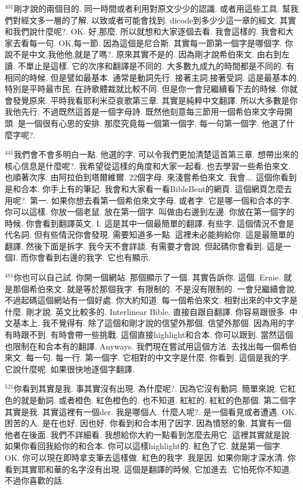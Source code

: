 \documentclass{book}
\begin{document}
$^{401}$剛才說的兩個目的.
同一時間或者利用對原文少少的認識.
或者用這些工具.
幫我們對經文多一層的了解.
以致或者可能會找到.
dicode到多少少這一章的經文.
其實和我們說什麼呢?.
OK.
好,那麼.
所以就想和大家逐個去看.
我會這樣的.
我會和大家去看每一句.
OK,每一節.
因為這個是尼合斯.
其實每一節第一個字是哪個字.
你說不是中文,我他他,就是了嗎?.
原來其實不是的.
因為剛才說希伯來文.
由右到左讀.
不單止是這樣.
它的次序和翻譯是不同的.
大多數九成九的時間都是不同的.
有相同的時候.
但是譬如最基本.
通常是動詞先行.
接著主詞,接著受詞.
這是最基本的.
特別是平時最市民.
在詩歌體裁就比較不同.
但是你一會兒繼續看下去的時候.
你就會發覺原來.
平時我看耶利米亞哀歌第三章.
其實是純粹中文翻譯.
所以大多數是你我他先行.
不過既然這首是一個字母詩.
既然他刻意每三節用一個希伯來文字母開頭.
是一個很有心思的安排.
那麼究竟每一個第一個字.
每一句第一個字.
他選了什麼字呢?.

$^{441}$我們會不會多明白一點.
他選的字.
可以令我們更加清楚這首第三章.
想帶出來的核心信息是什麼呢?.
我希望從這樣的角度和大家一起看.
也去學習一些希伯來文.
也順著次序.
由阿拉伯到塔爾維爾.
22個字母.
來淺嘗希伯來文.
我會….
這個你看到是和合本.
你手上有的筆記.
我會和大家看一看BibleBent的網頁.
這個網頁怎麼去用呢?.
第一.
如果你想去看第一個希伯來文字母.
或者字.
它是哪一個和合本的字.
你可以這樣.
你放一個老鼠.
放在第一個字.
叫做由右邊到左邊.
你放在第一個字的時候.
你會看到翻譯英文.
I.
這是其中一個最簡單的翻譯.
有些字.
這個情況不會是代名詞.
但有些情況你會發現.
需要知道多一點.
這裡未必能夠給你.
這是最簡單的翻譯.
然後下面是拆字.
我今天不會詳談.
有需要才會說.
但起碼你會看到.
這是一個I.
而你會看到右邊的我字.
它也有顯示.

$^{481}$你也可以自己試.
你開一個網站.
那個顯示了一個.
其實告訴你.
這個.
Ernie.
就是那個希伯來文.
就是等於那個我字.
有限制的.
不是沒有限制的.
一會兒繼續會說.
不過起碼這個網站有一個好處.
你大約知道.
每一個希伯來文.
相對出來的中文字是什麼.
剛才說.
英文比較多的.
Interlinear Bible.
直接自跟自翻譯.
你容易跟很多.
中文基本上.
我不覺得有.
除了這個和剛才說的信望外那個.
信望外那個.
因為用的字有時跟不到.
有時會帶一些挑戰.
這個直接highlight和合本.
你可以跟到.
當然這個也限制在和合本有的翻譯.
Anyways.
我們現在嘗試用這個方法.
去找出每一個希伯來文.
每一句.
每一行.
第一個字.
它相對的中文字是什麼.
你看到.
這個是我的字.
它說什麼呢.
如果很快地逐個字翻譯.

$^{521}$你看到其實是我.
事其實沒有出現.
為什麼呢?.
因為它沒有動詞.
簡單來說.
它紅色的就是動詞.
或者橙色.
紅色橙色的.
也不知道.
紅紅的.
紅紅的色那個.
第二個字其實是我.
其實這裡有一個der.
我是哪個人.
什麼人呢?.
是一個看見或者遭遇.
OK.
困苦的人.
是在也好.
因也好.
你看到和合本用了因字.
因為憤怒的象.
其實有一個他者在後面.
我們不詳細看.
我想給你大約一點看到怎麼去用它.
這裡其實就是說.
如果你看回我給你的和合本.
你可以這樣highlight的.
紅色了它.
就是第一個字.
OK.
你可以現在即時拿支筆去這樣做.
紅色的我字.
我是因.
如果你剛才深水清.
你看到其實耶和華的名字沒有出現.
這個是翻譯的時候.
它加進去.
它怕死你不知道.
不過你喜歡的話.
\end{document}
